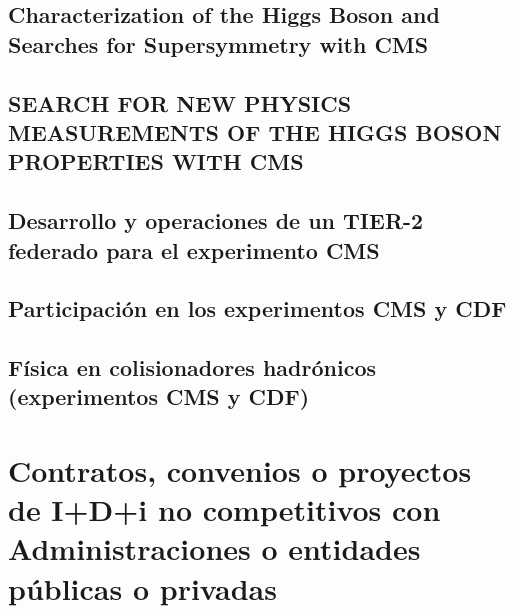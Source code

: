 \documentclass[a4paper, 11pt, twoside, openright]{report}
\begin{document}
\subsection{Characterization of the Higgs Boson and Searches for Supersymmetry with CMS}


\subsection{SEARCH FOR NEW PHYSICS MEASUREMENTS OF THE HIGGS BOSON PROPERTIES WITH CMS}


\subsection{Desarrollo y operaciones de un TIER-2 federado para el experimento CMS}


\subsection{Participación en los experimentos CMS y CDF}


\subsection{Física en colisionadores hadrónicos (experimentos CMS y CDF)}




\section{Contratos, convenios o proyectos de I+D+i no competitivos con Administraciones o entidades públicas o privadas}
\end{document}
